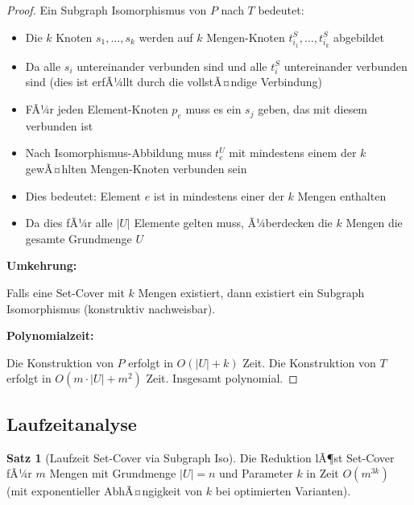 ﻿\documentclass[a4paper,12pt]{article}
\theoremstyle{definition}
\newtheorem{satz}{Satz}[section]
\begin{document}
\begin{proof}
	Ein Subgraph Isomorphismus von $P$ nach $T$ bedeutet:
	\begin{itemize}
		\item Die $k$ Knoten $s_1, \ldots, s_k$ werden auf $k$ Mengen-Knoten $t_{i_1}^S, \ldots, t_{i_k}^S$ abgebildet
		\item Da alle $s_i$ untereinander verbunden sind und alle $t_i^S$ untereinander verbunden sind (dies ist erfÃ¼llt durch die vollstÃ¤ndige Verbindung)
		\item FÃ¼r jeden Element-Knoten $p_e$ muss es ein $s_j$ geben, das mit diesem verbunden ist
		\item Nach Isomorphismus-Abbildung muss $t_e^U$ mit mindestens einem der $k$ gewÃ¤hlten Mengen-Knoten verbunden sein
		\item Dies bedeutet: Element $e$ ist in mindestens einer der $k$ Mengen enthalten
		\item Da dies fÃ¼r alle $|U|$ Elemente gelten muss, Ã¼berdecken die $k$ Mengen die gesamte Grundmenge $U$
	\end{itemize}
	
	\textbf{Umkehrung:}
	
	Falls eine Set-Cover mit $k$ Mengen existiert, dann existiert ein Subgraph Isomorphismus (konstruktiv nachweisbar).
	
	\textbf{Polynomialzeit:}
	
	Die Konstruktion von $P$ erfolgt in $O(|U| + k)$ Zeit. Die Konstruktion von $T$ erfolgt in $O(m \cdot |U| + m^2)$ Zeit. Insgesamt polynomial.
\end{proof}

\subsection{Laufzeitanalyse}

\begin{satz}[Laufzeit Set-Cover via Subgraph Iso]
	Die Reduktion lÃ¶st Set-Cover fÃ¼r $m$ Mengen mit Grundmenge $|U| = n$ und Parameter $k$ in Zeit $O(m^{3k})$ (mit exponentieller AbhÃ¤ngigkeit von $k$ bei optimierten Varianten).
\end{satz}
\end{document}
